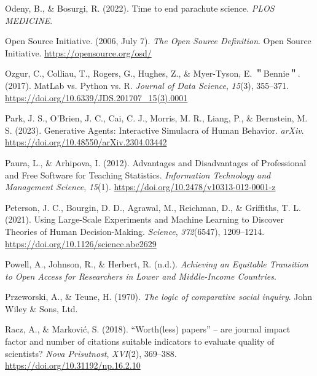 \documentclass[
  letterpaper,
  DIV=11,
  numbers=noendperiod]{scrreprt}
\newlength{\cslhangindent}
\newlength{\cslentryspacingunit} %
\newenvironment{CSLReferences}[2] %
 {%
  \setlength{\parindent}{0pt}
  \ifodd #1
  \let\oldpar\par
  \def\par{\hangindent=\cslhangindent\oldpar}
  \fi
  \setlength{\parskip}{#2\cslentryspacingunit}
 }%
 {}
\begin{document}
\begin{CSLReferences}{1}{0}
\leavevmode{}%
Odeny, B., \& Bosurgi, R. (2022). Time to end parachute science.
\emph{PLOS MEDICINE}.

\leavevmode{}%
Open Source Initiative. (2006, July 7). \emph{The {Open Source
Definition}}. Open Source Initiative. \url{https://opensource.org/osd/}

\leavevmode{}%
Ozgur, C., Colliau, T., Rogers, G., Hughes, Z., \& Myer-Tyson, E.
＂Bennie＂. (2017). {MatLab} vs. {Python} vs. {R}. \emph{Journal of Data
Science}, \emph{15}(3), 355--371.
\url{https://doi.org/10.6339/JDS.201707_15(3).0001}

\leavevmode{}%
Park, J. S., O'Brien, J. C., Cai, C. J., Morris, M. R., Liang, P., \&
Bernstein, M. S. (2023). Generative {Agents}: {Interactive Simulacra} of
{Human Behavior}. \emph{arXiv}.
\url{https://doi.org/10.48550/arXiv.2304.03442}

\leavevmode{}%
Paura, L., \& Arhipova, I. (2012). Advantages and {Disadvantages} of
{Professional} and {Free Software} for {Teaching Statistics}.
\emph{Information Technology and Management Science}, \emph{15}(1).
\url{https://doi.org/10.2478/v10313-012-0001-z}

\leavevmode{}%
Peterson, J. C., Bourgin, D. D., Agrawal, M., Reichman, D., \&
Griffiths, T. L. (2021). Using {Large-Scale Experiments} and {Machine
Learning} to {Discover Theories} of {Human Decision-Making}.
\emph{Science}, \emph{372}(6547), 1209--1214.
\url{https://doi.org/10.1126/science.abe2629}

\leavevmode{}%
Powell, A., Johnson, R., \& Herbert, R. (n.d.). \emph{Achieving an
{Equitable Transition} to {Open Access} for {Researchers} in {Lower} and
{Middle-Income Countries}}.

\leavevmode{}%
Przeworski, A., \& Teune, H. (1970). \emph{The logic of comparative
social inquiry}. John Wiley \& Sons, Ltd.

\leavevmode{}%
Racz, A., \& Marković, S. (2018). {``{Worth}(less) papers''} -- are
journal impact factor and number of citations suitable indicators to
evaluate quality of scientists? \emph{Nova Prisutnost}, \emph{XVI}(2),
369--388. \url{https://doi.org/10.31192/np.16.2.10}


\end{CSLReferences}
\end{document}
